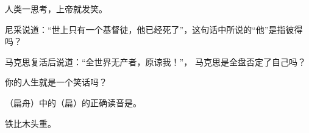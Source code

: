 \begin{question}
人类一思考，上帝就发笑。
\end{question}

\begin{question}
尼采说道：“世上只有一个基督徒，他已经死了”，这句话中所说的“他”是指彼得吗？
\end{question}

\begin{question}
马克思复活后说道：“全世界无产者，原谅我！”，
马克思是全盘否定了自己吗？
\end{question}

\begin{question}
你的人生就是一个笑话吗？
\end{question}


\begin{question}
（扁舟）中的（扁）的正确读音是。
\end{question}

\begin{question}
铁比木头重。
\end{question}

